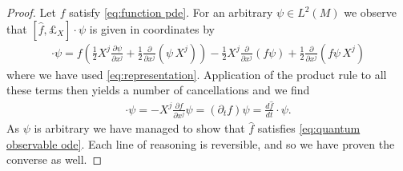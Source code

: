 \documentclass[final,leqno]{siamltex1213}
\newcommand{\pder}[2]{\ensuremath{\frac{ \partial #1}{\partial #2}}}
\begin{document}
\begin{proof}
	Let $f$ satisfy \eqref{eq:function pde}.
	For an arbitrary $\psi \in L^{2}(M)$ we observe that $[ \hat{f} , \pounds_{X}] \cdot \psi$ is given in coordinates by
	\begin{align}
		[ \hat{f} , \pounds_{X} ] \cdot \psi = f \left( \frac{1}{2} X^{j} \pder{\psi}{x^{j}} + \frac{1}{2} \pder{}{x^{j}} ( \psi \, X^{j} ) \right)
			- \frac{1}{2} X^{j} \pder{}{x^{j}}( f \psi)  + \frac{1}{2} \pder{}{x^{j}} (f \psi \, X^{j} )
	\end{align}
	where we have used \eqref{eq:representation}.  Application of the product rule to all these terms then yields
	a number of cancellations and we find
	\begin{align}
		[ \hat{f} , \pounds_{X} ] \cdot \psi = - X^{j} \pder{f}{x^{j}} \psi = (\partial_{t} f )\psi = \frac{d \hat{f} }{dt} \cdot \psi.
	\end{align}
	As $\psi$ is arbitrary we have managed to show that $\hat{f}$ satisfies \eqref{eq:quantum observable ode}.
	Each line of reasoning is reversible, and so we have proven the converse as well.
	

\end{proof}
\end{document}
